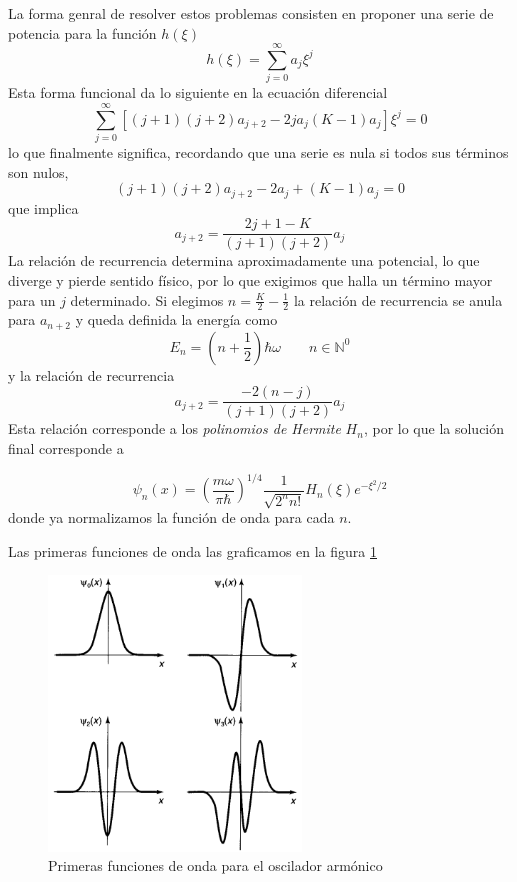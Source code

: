 \documentclass{book}
\numberwithin{equation}{section} %
\begin{document}
La forma genral de resolver estos problemas consisten en proponer una serie de potencia para la función $h(\xi)$
\[ h(\xi) = \sum_{j = 0}^{\infty} a_j \xi^j \]
Esta forma funcional da lo siguiente en la ecuación diferencial
\begin{equation}
    \sum_{j = 0}^{\infty} [(j + 1) (j + 2) a_{j + 2} - 2 j a_j (K - 1) a_j] \xi^j = 0
\end{equation}
lo que finalmente significa, recordando que una serie es nula si todos sus términos son nulos,
\[(j + 1)(j + 2) a_{j + 2} - 2 a_j + (K - 1) a_j = 0 \]
que implica
\begin{equation}
    a_{j + 2} = \frac{ 2j + 1 - K}{(j + 1) (j + 2)} a_j
\end{equation}
La relación de recurrencia determina aproximadamente una potencial, lo que diverge y pierde sentido físico, por lo que exigimos que halla un término mayor para un $j$ determinado.
Si elegimos $n = \frac{K}{2} - \frac{1}{2}$ la relación de recurrencia se anula para $a_{n + 2}$ y queda definida la energía como
\begin{equation}
    E_n = \left( n + \frac{1}{2}\right)\hbar \omega \qquad n \in \mathbb{N}^0
\end{equation}
y la relación de recurrencia
\begin{equation}
    a_{j + 2} = \frac{-2(n - j)}{(j + 1) (j + 2)} a_j
\end{equation}
Esta relación corresponde a los \emph{polinomios de Hermite} $H_n$, por lo que la solución final corresponde a

\begin{equation}
    \psi_n(x) = \left(\frac{m \omega}{\pi \hbar}\right)^{1/4} \frac{1}{\sqrt{2^n n!}} H_n(\xi) e^{-\xi^2/2}
\end{equation}
donde ya normalizamos la función de onda para cada $n$. 

Las primeras funciones de onda las graficamos en la figura \ref{fig:armonico_func_onda}

\begin{figure}[H]
    \centering
    \includegraphics[width=0.6\textwidth]{armonico_func_onda}
    \caption{Primeras funciones de onda para el oscilador armónico}
    \label{fig:armonico_func_onda}
\end{figure}
\end{document}

